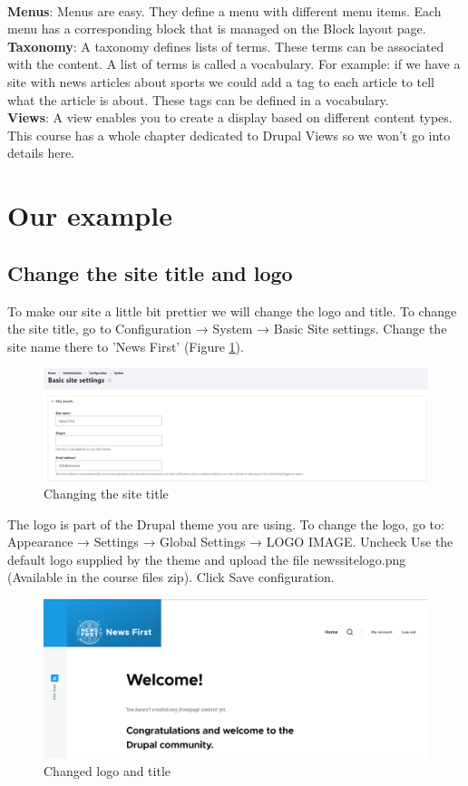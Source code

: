 \\
\textbf{Menus}: Menus are easy. They define a menu with different menu items. Each menu has a corresponding block that is managed on the Block layout page.
\\
\textbf{Taxonomy}: A taxonomy defines lists of terms. These terms can be associated with the content. A list of terms is called a vocabulary. For example: if we have a site with news articles about sports we could add a tag to each article to tell what the article is about. These tags can be defined in a vocabulary.
\\
\textbf{Views}: A view enables you to create a display based on different content types. This course has a whole chapter dedicated to Drupal Views so we won’t go into details here.

\section{Our example}
\subsection{Change the site title and logo}
To make our site a little bit prettier we will change the logo and title. To change the site title, go to Configuration → System → Basic Site settings. Change the site name there to 'News First'  (Figure \ref{fig:admin_site_details}).

\begin{figure}[H]
    \centering
    \includegraphics[width=1\linewidth]{img/ch4/admin_site_details}
    \caption{Changing the site title}
    \label{fig:admin_site_details}
\end{figure}

The logo is part of the Drupal theme you are using. To change the logo, go to: Appearance → Settings → Global Settings → LOGO IMAGE. Uncheck Use the default logo supplied by the theme and upload the file newssite\textunderscore logo.png (Available in the course files zip). Click Save configuration.

\begin{figure}[H]
    \centering
    \includegraphics[width=1\linewidth]{img/ch4/site_main_logo}
    \caption{Changed logo and title}
    \label{fig:site_main_logo}
\end{figure}


